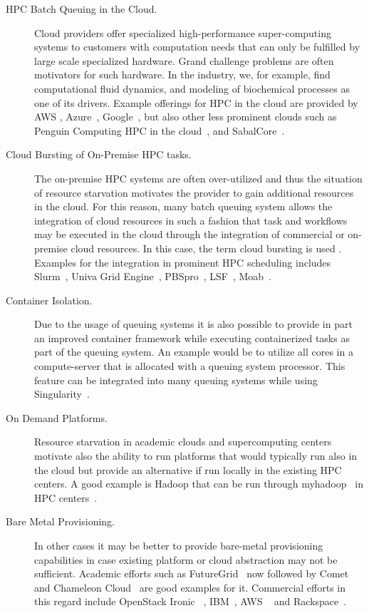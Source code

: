 \documentclass[final,5p,times,twocolumn]{elsarticle}
\begin{document}
\begin{description}

\item[HPC Batch Queuing in the Cloud.] Cloud providers offer specialized high-performance super-computing systems to customers with computation needs that can only be fulfilled by large scale specialized hardware. Grand challenge problems are often motivators for such hardware. In the industry, we, for example, find computational fluid dynamics, and modeling of biochemical processes as one of its drivers. Example offerings for HPC in the cloud are provided by AWS \cite{www-aws-hpc}, Azure~\cite{www-azure-hpc}, Google~\cite{www-google-hpc}, but also other less prominent clouds such as Penguin Computing HPC in the cloud~\cite{PODHPCCloud2019}, and SabalCore~\cite{Sabalcore2019}.
 
\item[Cloud Bursting of On-Premise HPC tasks.] The on-premise HPC systems are often over-utilized and thus the situation of resource starvation motivates the provider to gain additional resources in the cloud. For this reason, many batch queuing system allows the integration of cloud resources in such a fashion that task and workflows may be executed in the cloud through the integration of commercial or on-premise cloud resources. In this case, the term cloud bursting is used \cite{CloudBursting2019,BurstingHPC2019}. Examples for the integration in prominent HPC scheduling includes Slurm~\cite{www-slurm}, Univa Grid Engine~\cite{www-univa}, PBSpro~\cite{www-pbs-manual}, LSF~\cite{www-lsf}, Moab~\cite{www-moab}.

\item[Container Isolation.] Due to the usage of queuing systems it is also possible to provide in part an improved container framework while executing containerized tasks as part of the queuing system. An example would be to utilize all cores in a compute-server that is allocated with a queuing system processor. This feature can be integrated into many queuing systems while using Singularity~\cite{www-singularity}.

\item[On Demand Platforms.] Resource starvation in academic clouds and supercomputing centers motivate also the ability to run platforms that would typically run also in the cloud but provide an alternative if run locally in the existing HPC centers. A good example is Hadoop that can be run through myhadoop~\cite{krishnan2011myhadoop} in HPC centers~\cite{SDSC2019}.

\item[Bare Metal Provisioning.] In other cases it may be better to provide bare-metal provisioning capabilities in case existing platform or cloud abstraction may not be sufficient. Academic efforts such as FutureGrid~\cite{las12fg-bookchapter} now followed by Comet~\cite{las-comet} and Chameleon Cloud~\cite{Chameleoncloud2019} are good examples for it. Commercial efforts in this regard include OpenStack Ironic ~\cite{OpenstackIronic2019}, IBM~\cite{IBMBareMetal2019}, AWS ~\cite{AWS2019} and Rackspace~\cite{Rackspace2019}.

\end{description}
\end{document}
